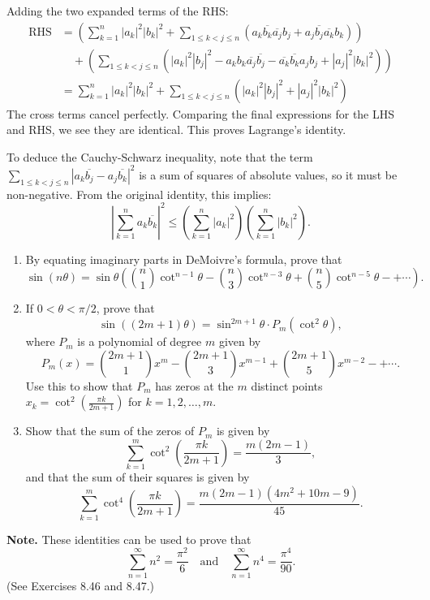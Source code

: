 Adding the two expanded terms of the RHS:
\begin{align*}
\text{RHS} &= \left( \sum_{k=1}^n |a_k|^2 |b_k|^2 + \sum_{1 \leq k < j \leq n} (a_k \overline{b_k} \overline{a_j} b_j + a_j \overline{b_j} \overline{a_k} b_k) \right) \\
&\quad + \left( \sum_{1 \leq k < j \leq n} (|a_k|^2 |b_j|^2 - a_k b_k \overline{a_j} \overline{b_j} - \overline{a_k} \overline{b_k} a_j b_j + |a_j|^2 |b_k|^2) \right) \\
&= \sum_{k=1}^n |a_k|^2 |b_k|^2 + \sum_{1 \leq k < j \leq n} (|a_k|^2 |b_j|^2 + |a_j|^2 |b_k|^2)
\end{align*}
The cross terms cancel perfectly. Comparing the final expressions for the LHS and RHS, we see they are identical. This proves Lagrange's identity.

To deduce the Cauchy-Schwarz inequality, note that the term $\sum_{1 \leq k < j \leq n} |a_k \overline{b_j} - a_j \overline{b_k}|^2$ is a sum of squares of absolute values, so it must be non-negative. From the original identity, this implies:
\[ \left| \sum_{k=1}^n a_k \overline{b_k} \right|^2 \leq \left( \sum_{k=1}^n |a_k|^2 \right) \left( \sum_{k=1}^n |b_k|^2 \right). \]


\begin{problembox}
\begin{enumerate}[label=\textbf{(\alph*)}]
\item By equating imaginary parts in DeMoivre’s formula, prove that
\[
\sin(n\theta) = \sin \theta \left( \binom{n}{1} \cot^{n-1} \theta - \binom{n}{3} \cot^{n-3} \theta + \binom{n}{5} \cot^{n-5} \theta - + \cdots \right).
\]
\item If \( 0 < \theta < \pi/2 \), prove that
\[
\sin((2m+1)\theta) = \sin^{2m+1} \theta \cdot P_m(\cot^2 \theta),
\]
where \( P_m \) is a polynomial of degree \( m \) given by
\[
P_m(x) = \binom{2m+1}{1} x^m - \binom{2m+1}{3} x^{m-1} + \binom{2m+1}{5} x^{m-2} - +\cdots.
\]
Use this to show that \( P_m \) has zeros at the \( m \) distinct points \( x_k = \cot^2 \left( \frac{\pi k}{2m+1} \right) \) for \( k = 1, 2, \dots, m \).
\item Show that the sum of the zeros of \( P_m \) is given by
\[
\sum_{k=1}^m \cot^2 \left( \frac{\pi k}{2m+1} \right) = \frac{m(2m-1)}{3},
\]
and that the sum of their squares is given by
\[
\sum_{k=1}^m \cot^4 \left( \frac{\pi k}{2m+1} \right) = \frac{m(2m-1)(4m^2 + 10m - 9)}{45}.
\]
\end{enumerate}
\textbf{Note.} These identities can be used to prove that
\[
\sum_{n=1}^\infty n^2 = \frac{\pi^2}{6} \quad \text{and} \quad \sum_{n=1}^\infty n^4 = \frac{\pi^4}{90}.
\]
(See Exercises 8.46 and 8.47.)
\end{problembox}

